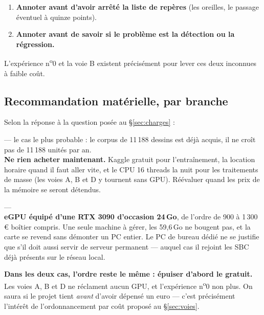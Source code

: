 \documentclass[11pt,a4paper]{article}
\newcommand{\aretenir}[1]{%
  \par\medskip
  \noindent\colorbox{encadre}{%
    \begin{minipage}{\dimexpr\linewidth-2\fboxsep}
      \vspace{2pt}#1\vspace{2pt}
    \end{minipage}}%
  \par\medskip
}
\begin{document}
\begin{enumerate}[leftmargin=*,itemsep=3pt]
  \item \textbf{Annoter avant d'avoir arrêté la liste de repères} (les oreilles,
  le passage éventuel à quinze points).
  \item \textbf{Annoter avant de savoir si le problème est la détection ou la
  régression.}
\end{enumerate}

L'expérience n\textsuperscript{o}0 et la voie B existent précisément pour lever
ces deux inconnues à faible coût.

\subsection{Recommandation matérielle, par branche}
\label{sec:reco}

Selon la réponse à la question posée au §\ref{sec:charges} :

\begin{description}[leftmargin=0pt,style=unboxed,itemsep=8pt]
  \item[\textnormal{\textbf{Si la restauration par lot est \emph{occasionnelle}}}]
  --- le cas le plus probable : le corpus de 11\,188 dessins est déjà acquis, il
  ne croît pas de 11\,188 unités par an. \\
  \textbf{Ne rien acheter maintenant.} Kaggle gratuit pour l'entraînement, la
  location horaire quand il faut aller vite, et le CPU 16 threads la nuit pour
  les traitements de masse (les voies A, B et D y tournent sans GPU). Réévaluer
  quand les prix de la mémoire se seront détendus.

  \item[\textnormal{\textbf{Si le corpus entier doit être restauré \emph{régulièrement}}}]
  --- \\
  \textbf{eGPU équipé d'une RTX 3090 d'occasion 24\,Go}, de l'ordre de
  900 à 1\,300\,\euro{} boîtier compris. Une seule machine à gérer, les 59,6\,Go
  ne bougent pas, et la carte se revend sans démonter un PC entier. Le PC de
  bureau dédié ne se justifie que s'il doit aussi servir de serveur permanent —
  auquel cas il rejoint les SBC déjà présents sur le réseau local.
\end{description}

\aretenir{\textbf{Dans les deux cas, l'ordre reste le même : épuiser d'abord le
gratuit.} Les voies A, B et D ne réclament aucun GPU, et l'expérience
n\textsuperscript{o}0 non plus. On saura si le projet tient \emph{avant} d'avoir
dépensé un euro — c'est précisément l'intérêt de l'ordonnancement par coût
proposé au §\ref{sec:voies}.}
\end{document}
